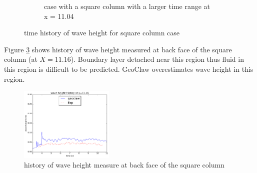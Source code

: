 \documentclass[11pt]{article}
\begin{document}
\begin{figure}[h!]
\begin{subfigure}[b]{0.4\textwidth}
        \caption{case with a square column with a larger time range at x = 11.04}
        \label{fig:waveheight_square_x=11.04}
    \end{subfigure}
    \caption{time history of wave height for square column case}
\end{figure}
\par
Figure \ref{fig:waveheight_square_back} shows history of wave height measured at back face of the square column (at $X = 11.16$). Boundary layer detached near this region thus fluid in this region is difficult to be predicted. GeoClaw overestimates wave height in this region.  
\begin{figure}[h!]
    \centering
    \includegraphics[width=0.4\textwidth]{./plots/waveheight_square_back}
    \caption{history of wave height measure at back face of the square column}
    \label{fig:waveheight_square_back}
\end{figure}

\end{document}
